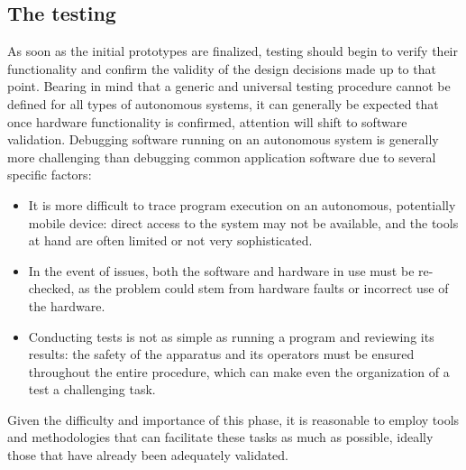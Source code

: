 \subsection{The testing}
\label{sec:design_challenges_testing}
As soon as the initial prototypes are finalized, testing should begin to verify their functionality and confirm the validity of the design decisions made up to that point. Bearing in mind that a generic and universal testing procedure cannot be defined for all types of autonomous systems, it can generally be expected that once hardware functionality is confirmed, attention will shift to software validation. Debugging software running on an autonomous system is generally more challenging than debugging common application software due to several specific factors:

\begin{itemize}
    \item It is more difficult to trace program execution on an autonomous, potentially mobile device: direct access to the system may not be available, and the tools at hand are often limited or not very sophisticated.
    \item In the event of issues, both the software and hardware in use must be re-checked, as the problem could stem from hardware faults or incorrect use of the hardware.
    \item Conducting tests is not as simple as running a program and reviewing its results: the safety of the apparatus and its operators must be ensured throughout the entire procedure, which can make even the organization of a test a challenging task.
\end{itemize}

Given the difficulty and importance of this phase, it is reasonable to employ tools and methodologies that can facilitate these tasks as much as possible, ideally those that have already been adequately validated.

